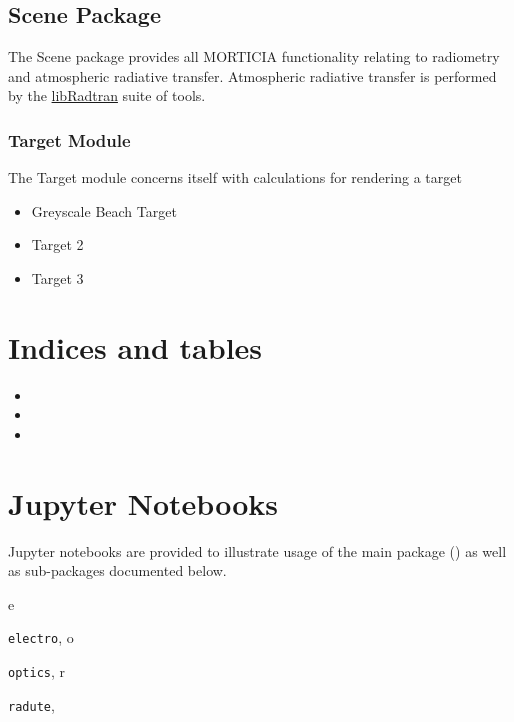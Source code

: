 \documentclass[a4paper,10pt,english]{sphinxmanual}
\begin{document}
\section{Scene Package}
\label{packages:scene-package}\label{packages:id5}
The Scene package provides all MORTICIA functionality relating to radiometry and atmospheric radiative transfer.
Atmospheric radiative transfer is performed by the \href{http://www.libradtran.org}{libRadtran} suite of tools.


\subsection{Target Module}
\label{packages:target-module}\label{packages:id7}
The Target module concerns itself with calculations for rendering a target
\begin{itemize}
\item {} 
Greyscale Beach Target

\item {} 
Target 2

\item {} 
Target 3

\end{itemize}


\chapter{Indices and tables}
\label{index:indices-and-tables}\begin{itemize}
\item {} 

\item {} 

\item {} 

\end{itemize}


\chapter{Jupyter Notebooks}
\label{index:jupyter-notebooks}
Jupyter notebooks are provided to illustrate usage of the main package () as well as sub-packages
documented below.


\renewcommand{\indexname}{Python Module Index}
\begin{theindex}
\def\bigletter#1{{\Large\sffamily#1}\nopagebreak\vspace{1mm}}
\bigletter{e}
\item {\texttt{electro}}, \pageref{packages:module-electro}
\indexspace
\bigletter{o}
\item {\texttt{optics}}, \pageref{packages:module-optics}
\indexspace
\bigletter{r}
\item {\texttt{radute}}, \pageref{packages:module-radute}
\end{theindex}

\renewcommand{\indexname}{Index}
\printindex
\end{document}

